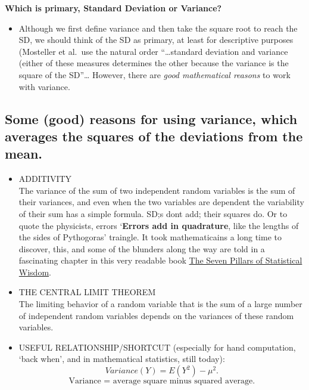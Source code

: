 \documentclass[]{book}
\providecommand{\tightlist}{%
  \setlength{\itemsep}{0pt}\setlength{\parskip}{0pt}}
\begin{document}
\textbf{Which is primary, Standard Deviation or Variance?}

\begin{itemize}
\tightlist
\item
  Although we first define variance and then take the square root to reach the SD, we should think of the SD as primary, at least for descriptive purposes (Mosteller et al.~use the natural order ``\ldots{}standard deviation and variance (either of these measures determines the other because the variance is the square of the SD''\ldots{} However, there are \emph{good mathematical reasons} to work with variance.
\end{itemize}

\hypertarget{some-good-reasons-for-using-variance-which-averages-the-squares-of-the-deviations-from-the-mean.}{%
\subsection{Some (good) reasons for using variance, which averages the squares of the deviations from the mean.}\label{some-good-reasons-for-using-variance-which-averages-the-squares-of-the-deviations-from-the-mean.}}

\begin{itemize}
\item
  ADDITIVITY\\
  The variance of the sum of two independent random variables is the sum of their variances, and even when the two variables are dependent the variability of their sum has a simple formula. SD;s dont add; their squares do. Or to quote the physicists, errors `\textbf{Errors add in quadrature}, like the lengths of the sides of Pythogoras' traingle. It took mathematicains a long time to discover, this, and some of the blunders along the way are told in a fascinating chapter in this very readable book \href{https://www-degruyter-com.proxy3.library.mcgill.ca/view/title/521193}{The Seven Pillars of
  Statistical Wisdom}.
\item
  THE CENTRAL LIMIT THEOREM\\
  The limiting behavior of a random variable that is the sum of a large number of independent random variables depends on the variances of these random variables.
\item
  USEFUL RELATIONSHIP/SHORTCUT (especially for hand computation, `back when', and in mathematical statistics, still today):\\
  \[Variance(Y) = E(Y^2) - \mu^2.\]
  \[\textrm{Variance =  average  square  minus   squared average}.\]
\end{itemize}
\end{document}
